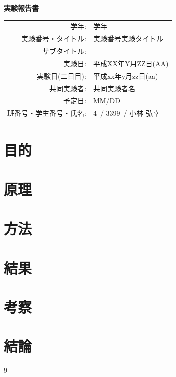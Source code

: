 \documentclass[11pt,dvipdfmx]{jarticle}
\providecommand{\Gakunen}{}
\providecommand{\NumTitleNum}{}
\providecommand{\NumTitleTitle}{}
\providecommand{\SubTitle}{}
\providecommand{\Jikkenbi}{}
\providecommand{\JikkenbiII}{}
\providecommand{\Kyoudou}{}
\providecommand{\Yoteibi}{}
\providecommand{\HanNumber}{}
\providecommand{\StudentNumber}{}
\providecommand{\StudentName}{}
\newcommand{\gakunen}[1]{\renewcommand{\Gakunen}{#1}}
\newcommand{\numTitle}[2]{\renewcommand{\NumTitleNum}{#1}\renewcommand{\NumTitleTitle}{#2}}
\newcommand{\subTitle}[1]{\renewcommand{\SubTitle}{#1}}
\newcommand{\jikkenbi}[1]{\renewcommand{\Jikkenbi}{#1}}
\newcommand{\jikkenbiII}[1]{\renewcommand{\JikkenbiII}{#1}}
\newcommand{\kyoudou}[1]{\renewcommand{\Kyoudou}{#1}}
\newcommand{\yoteibi}[1]{\renewcommand{\Yoteibi}{#1}}
\newcommand{\hanNumberName}[3]{\renewcommand{\HanNumber}{#1}\renewcommand{\StudentNumber}{#2}\renewcommand{\StudentName}{#3}}
\newenvironment{jikkenTitle}{%
	\thispagestyle{empty}
	\begin{center}
		{\Huge \bfseries 実験報告書}\\[2em]
	}{%
		\vfill
		\begin{tabular}{rl}
			学年: & \Gakunen \\
			実験番号・タイトル: & \NumTitleNum\quad \NumTitleTitle \\
			サブタイトル: & \SubTitle \\
			実験日: & \Jikkenbi \\
			実験日(二日目): & \JikkenbiII \\
			共同実験者: & \Kyoudou \\
			予定日: & \Yoteibi \\
			班番号・学生番号・氏名: & \HanNumber\ / \StudentNumber\ / \StudentName \\
		\end{tabular}
		\end{center}
		\clearpage
}
\begin{document}
\begin{jikkenTitle}
	\gakunen{学年} %
	\numTitle{実験番号}{実験タイトル} %
	\subTitle{} %
	\jikkenbi{平成XX年Y月ZZ日(AA)} %
	\jikkenbiII{平成xx年y月zz日(aa)} %
	\kyoudou{共同実験者名} %
	\yoteibi{MM/DD}%
	\hanNumberName{4}{3399}{小林 弘幸} %
\end{jikkenTitle}

\section{目的}
\section{原理}
\section{方法}
\section{結果}
\section{考察}
\section{結論}

\begin{thebibliography}{9}%
\end{thebibliography}
\end{document}
